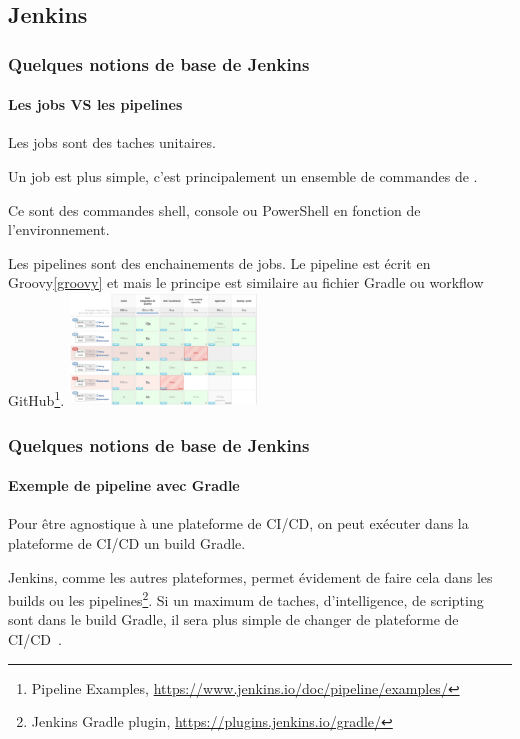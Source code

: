 \documentclass{beamer}
\begin{document}
    \subsection{Jenkins}\label{subsec:jenkins}
    \begin{frame}
        \frametitle{Quelques notions de base de Jenkins}
        \framesubtitle{Les jobs VS les pipelines}
        \transdissolve
        Les jobs sont des taches unitaires.

        Un job est plus simple, c'est principalement un ensemble de commandes de .

        Ce sont des commandes shell, console ou PowerShell en fonction de l'environnement.

        \bigbreak
        Les pipelines sont des enchainements de jobs.
        Le pipeline est écrit en Groovy\cref{groovy} et mais le principe est similaire au fichier Gradle ou workflow GitHub\footnote{Pipeline Examples, \url{https://www.jenkins.io/doc/pipeline/examples/}}.
        \bigbreak
        \centering
        \includegraphics[width=5cm]{image/jenkins-pipeline}
    \end{frame}

    \begin{frame}
        \frametitle{Quelques notions de base de Jenkins}
        \framesubtitle{Exemple de pipeline avec Gradle}
        \transdissolve
        Pour être agnostique à une plateforme de CI/CD, on peut exécuter dans la plateforme de CI/CD un build Gradle.

        Jenkins, comme les autres plateformes, permet évidement de faire cela dans les builds ou les pipelines\footnote{Jenkins Gradle plugin, \url{https://plugins.jenkins.io/gradle/}}.
        \bigbreak
        Si un maximum de taches, d'intelligence, de scripting sont dans le build Gradle, il sera plus simple de changer de plateforme de CI/CD~.
    \end{frame}
\end{document}
